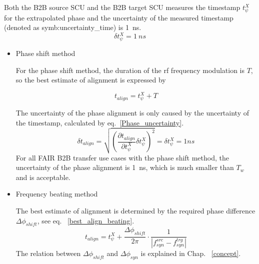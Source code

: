 Both the B2B source SCU and the B2B target SCU measures the timestamp $t_\psi^X$ for the extrapolated phase and the uncertainty of the measured timestamp (denoted as \gls{symb:uncertainty_time}) is \SI{1}{ns}.  
\begin{equation} 
\delta t_\psi^X= \SI{1}{ns}
\label{jitter_measure_t}
\end{equation}

\begin{itemize}
\item Phase shift method

For the phase shift method, the duration of the rf frequency modulation is $T$, so the best estimate of alignment is expressed by 

\begin{equation}
t_\mathit{align} = t_{\psi}^X + T \label{Phase_win}
\end{equation}

The uncertainty of the phase alignment is only caused by the uncertainty of the timestamp, calculated by eq.~\ref{Phase_uncertainty}.
\begin{equation}
\delta t_\mathit{align} =\sqrt {(\frac {\partial t_\mathit{align}}{\partial t_{\psi}^X}\delta t_{\psi}^X)^2} =\delta t_{\psi}^X=1ns
\label{Phase_uncertainty}
\end{equation}
For all FAIR B2B transfer use cases with the phase shift method, the uncertainty of the phase alignment is \SI{1}{ns}, which is much smaller than $T_\mathit{w}$ and is acceptable.

\item Frequency beating method

The best estimate of alignment is determined by the required phase difference $\Delta \phi_\mathit{shift}$, see eq. ~\ref{best_align_beating}.
\begin{equation}
t_\mathit{align}= t_\psi^\mathit{X}+\frac{\Delta \phi_\mathit{shift}}{2\pi}\cdot\frac{1}{|f_{\mathit{syn}}^\mathit{src}-f_{\mathit{syn}}^\mathit{trg}|}
\label{best_align_beating}
\end{equation}
The relation between $\Delta \phi_\mathit{shift}$ and $\Delta \phi_\mathit{syn}$ is explained in Chap. ~\ref{concept}. 


\end{itemize}
